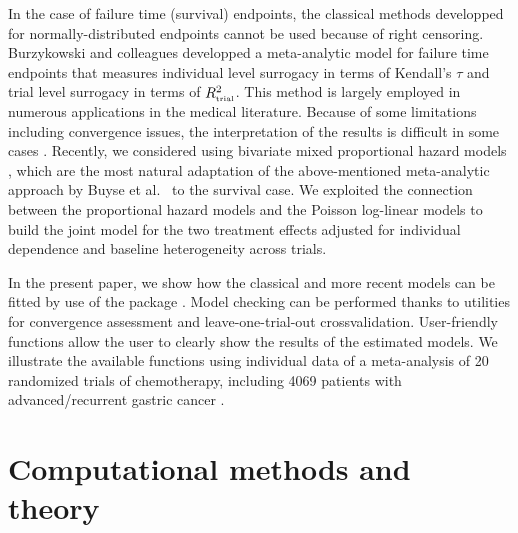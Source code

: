 \documentclass[]{scrartcl}\usepackage[]{graphicx}\usepackage[]{color}
\begin{document}
{In the case of failure time (survival) endpoints,
  the classical methods developped for normally-distributed endpoints
  cannot be used because of right censoring.
Burzykowski and colleagues \cite{BurzykowskiEtal01} developped a meta-analytic model
  for failure time endpoints that measures
  individual level surrogacy in terms of Kendall's $\tau$ \citep{Kendall38}
  and trial level surrogacy in terms of $R^2_\text{\tiny trial}$.
This method is largely employed in numerous applications in the medical literature.
Because of some limitations including convergence issues,
  the interpretation of the results is difficult in some cases
  \citep{Oba2013, BurzykowskiCortinas05}.
Recently, we considered using bivariate mixed proportional hazard models
   \citep{DuchateauJanssen08},
  which are the most natural adaptation of the above-mentioned
  meta-analytic approach by Buyse et al.~\cite{BuyseEtal00} to the survival case.
We exploited \citep{RotoloPoissurogate}
  the connection between the proportional hazard models
  and the Poisson log-linear models \citep{Whitehead80, LairdOlivier81}
  to build the joint model for the two treatment effects adjusted
  for individual dependence and baseline heterogeneity across trials.

In the present paper, we show how the classical and more recent models
  can be fitted by use of the  \citep{R}
  package  \citep{R:surrosurv}.
Model checking can be performed thanks to utilities for convergence assessment
    and leave-one-trial-out crossvalidation.
User-friendly functions allow the user to clearly show the results of the 
    estimated models.
We illustrate the available functions 
  using individual data of a meta-analysis of 20 randomized trials of chemotherapy,
  including 4069 patients with advanced/recurrent gastric cancer
  \citep{GASTRIC13, Paoletti2013}.


\section{Computational methods and theory}
\label{sec:methods}

}
\end{document}
